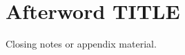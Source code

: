 \documentclass[11pt,twoside]{book} %
\begin{document}
\frontmatter


\tableofcontents



\mainmatter



\backmatter
\chapter*{Afterword TITLE}
Closing notes or appendix material.
\end{document}
